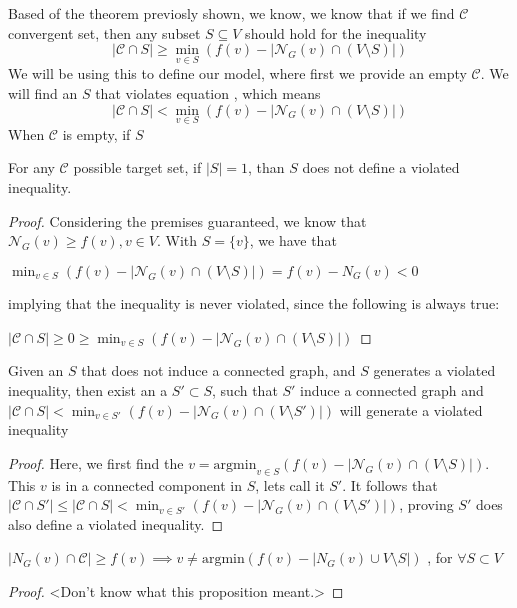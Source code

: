 Based of the theorem previosly shown, we know, we know that if we find $\mathcal{C}$ convergent set, then any subset $S \subseteq V$ should hold for the inequality
\begin{equation}
    |\mathcal{C} \cap S| \geq \min_{v \in S} (f(v) - |\mathcal{N}_G(v) \cap (V \setminus S)| ) 
\end{equation}
We will be using this to define our model, where first we provide an empty $\mathcal{C}$. We will find an $S$ that violates equation , which means
\begin{equation}
    |\mathcal{C} \cap S| < \min_{v \in S} (f(v) - |\mathcal{N}_G(v) \cap (V \setminus S)| ) 
\end{equation}
When $\mathcal{C}$ is empty, if $S $
\begin{myprop}
For any $\mathcal{C}$ possible target set, if $|S| = 1$, than $S$ does not define a violated inequality.
\end{myprop}
\begin{proof}
Considering the premises guaranteed, we know that $\mathcal{N}_G(v) \geq f(v), v \in V$. With $S = \{v\}$, we have that

$\min_{v \in S} (f(v) - |\mathcal{N}_G(v) \cap (V \setminus S)| ) = f(v) - N_G(v)  < 0$ 

implying  that the inequality is never violated, since the following is always true:  

$|\mathcal{C} \cap S | \geq 0 \geq\min_{v \in S} (f(v) - |\mathcal{N}_G(v) \cap (V \setminus S)|) $ 
\end{proof}

\begin{myprop}
Given an $S$ that does not induce a connected graph, and $S$ generates a violated inequality, then exist an a $S' \subset S$, such that $S'$ induce a connected graph and $|\mathcal{C} \cap S | <  \min_{v \in S'} (f(v) - |\mathcal{N}_G(v) \cap (V \setminus S')|) $ will generate a violated inequality
\end{myprop}
\begin{proof}
Here, we first find the $v = \text{argmin}_{v \in S} (f(v) - |\mathcal{N}_G(v) \cap (V \setminus S)|)$. This $v$ is in a connected component in $S$, lets call it $S'$. It follows that $|\mathcal{C} \cap S' | \leq |\mathcal{C} \cap S | <  \min_{v \in S'} (f(v) - |\mathcal{N}_G(v) \cap (V \setminus S')|) $, proving $S'$ does also define a violated inequality. 
\end{proof}

\begin{myprop}
$ | N_G(v) \cap \mathcal{C}|  \geq f(v) \implies v \neq \text{argmin} (f(v) - |N_G(v) \cup V\setminus S|)$ , for $\forall S \subset V$
\end{myprop}
\begin{proof}
<Don't know what this proposition meant.>
\end{proof}

